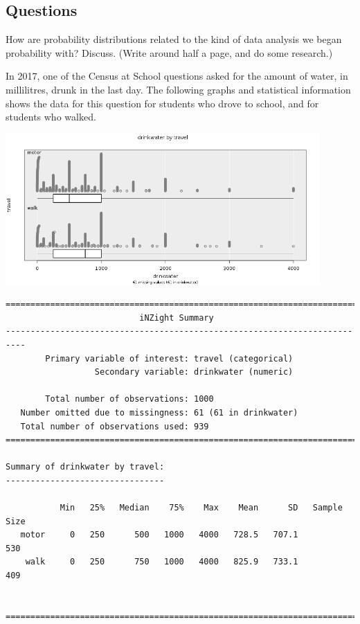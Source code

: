 \subsection*{Questions}
\begin{questions}
  \item How are probability distributions related to the kind of data analysis we began probability with? Discuss. (Write
        around half a page, and do some research.)
  \item In 2017, one of the Census at School questions asked for the amount of water, in millilitres, drunk in the last day.
        The following graphs and statistical information shows the data for this question for students who drove to school, and
        for students who walked.
        \begin{center}
          \includegraphics[width=0.9\textwidth]{drinktravel1}
        \end{center}
\begin{verbatim}
==========================================================================
                           iNZight Summary
--------------------------------------------------------------------------
        Primary variable of interest: travel (categorical)
                  Secondary variable: drinkwater (numeric)

        Total number of observations: 1000
   Number omitted due to missingness: 61 (61 in drinkwater)
   Total number of observations used: 939
==========================================================================

Summary of drinkwater by travel:
--------------------------------

           Min   25%   Median    75%    Max    Mean      SD   Sample Size
   motor     0   250      500   1000   4000   728.5   707.1           530
    walk     0   250      750   1000   4000   825.9   733.1           409


==========================================================================
\end{verbatim}
    \begin{parts}

\end{parts}
\end{questions}
